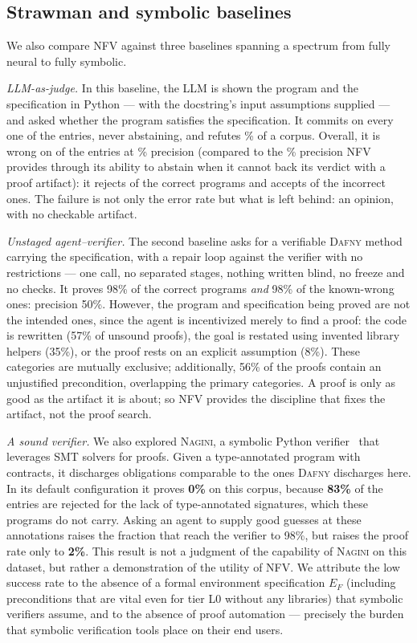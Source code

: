 \documentclass[11pt,letterpaper]{article}
\newcommand{\daf}{\textsc{Dafny}}
\newcommand{\nag}{\textsc{Nagini}}
\begin{document}
\subsection{Strawman and symbolic baselines}
\label{sec:naive}

We also compare NFV against three baselines spanning a spectrum from fully neural to fully symbolic.

\emph{LLM-as-judge.} In this baseline, the LLM
is shown the program and the specification in Python --- with the docstring's input
assumptions supplied --- and asked whether the program
satisfies the specification. It commits on every one of the \jdgtotal{} entries,
never abstaining, and refutes \jdgsaidbadpct{}\% of a corpus. Overall, it is wrong 
on \jdgwrong{} of the \jdgtotal{} entries at \jdgallprec{}\% precision
(compared to the \anpipeprec{}\% precision NFV provides through its ability to abstain when it cannot
back its verdict with a proof artifact):
it rejects \jdgfalsealarm{} of the \jdgpairs{} correct programs and accepts \jdgmissed{} of the
\jdgbuggy{} incorrect ones. 
The failure is not only the error rate but what is left behind: an opinion, with no checkable artifact.

\emph{Unstaged agent--verifier.} The second baseline asks for a
verifiable \daf{} method carrying the specification, with a repair loop against
the verifier with no restrictions --- one call, no separated stages, nothing written
blind, no freeze and no checks. It proves 98\% of the correct programs \emph{and}
98\% of the known-wrong ones: precision 50\%. However, the program and specification being proved 
are not the intended ones,
since the agent is incentivized merely to find a proof: the code is rewritten
(57\% of unsound proofs), the goal is restated using invented library helpers
(35\%), or the proof rests on an explicit assumption (8\%). These categories
are mutually exclusive; additionally, 56\% of the proofs contain an unjustified
precondition, overlapping the primary categories. A proof is only as good
as the artifact it is about; so NFV provides the discipline that fixes the artifact, not the
proof search.

\emph{A sound verifier.} We also explored \nag{}, a
symbolic Python verifier~\cite{eilers2018nagini} that leverages SMT solvers for proofs. Given a
type-annotated program with contracts, it discharges obligations comparable to
the ones \daf{} discharges here. In its default configuration it proves \textbf{0\%} on this corpus, because \textbf{83\%} of the 
entries are rejected for the lack of type-annotated signatures, which these programs do not carry.
Asking an agent to supply good guesses at these annotations raises the fraction that reach the verifier to
98\%, but raises the proof rate only to \textbf{2\%}. 
This result is not a judgment of the capability of \nag{} on this dataset, but rather a demonstration of the utility of NFV.
We attribute the low success rate to the absence of
a formal environment specification $E_F$ (including preconditions that are vital even for tier L0 without any libraries) 
that symbolic verifiers assume, and to the absence of proof
automation --- precisely the burden that symbolic verification tools place on their end users.
\end{document}

